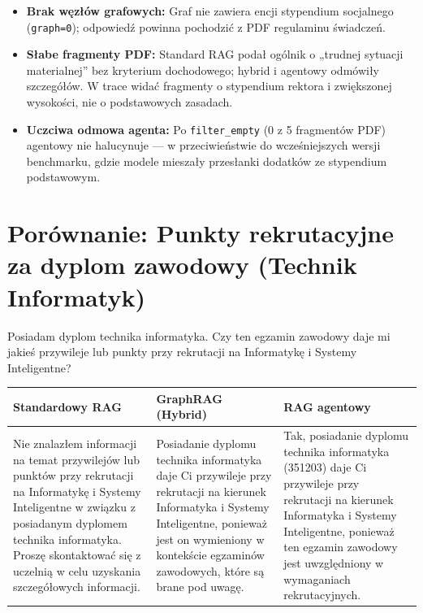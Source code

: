 \begin{tcolorbox}[colback=red!5!white,colframe=red!50!black,title=Wnioski i obserwacje]
    \begin{itemize}
        \item \textbf{Brak węzłów grafowych:} Graf nie zawiera encji stypendium socjalnego (\texttt{graph=0}); odpowiedź powinna pochodzić z PDF regulaminu świadczeń.
        \item \textbf{Słabe fragmenty PDF:} Standard RAG podał ogólnik o „trudnej sytuacji materialnej'' bez kryterium dochodowego; hybrid i agentowy odmówiły szczegółów. W trace widać fragmenty o stypendium rektora i zwiększonej wysokości, nie o podstawowych zasadach.
        \item \textbf{Uczciwa odmowa agenta:} Po \texttt{filter\_empty} (0 z 5 fragmentów PDF) agentowy nie halucynuje --- w przeciwieństwie do wcześniejszych wersji benchmarku, gdzie modele mieszały przesłanki dodatków ze stypendium podstawowym.
    \end{itemize}
\end{tcolorbox}
\vspace{1em}

\newpage
\section*{Porównanie: Punkty rekrutacyjne za dyplom zawodowy (Technik Informatyk)}

\begin{tcolorbox}[colback=blue!5!white,colframe=blue!75!black,title=Pytanie użytkownika]
    Posiadam dyplom technika informatyka. Czy ten egzamin zawodowy daje mi jakieś przywileje lub punkty przy rekrutacji na Informatykę i Systemy Inteligentne?
\end{tcolorbox}

\noindent
\begin{tabularx}{\textwidth}{@{} >{\raggedright\arraybackslash}X >{\raggedright\arraybackslash}X >{\raggedright\arraybackslash}X @{}}
    \toprule
    \textbf{Standardowy RAG} & \textbf{GraphRAG (Hybrid)} & \textbf{RAG agentowy} \\
    \midrule
    \footnotesize Nie znalazłem informacji na temat przywilejów lub punktów przy rekrutacji na Informatykę i Systemy Inteligentne w związku z posiadanym dyplomem technika informatyka. Proszę skontaktować się z uczelnią w celu uzyskania szczegółowych informacji. & \footnotesize Posiadanie dyplomu technika informatyka daje Ci przywileje przy rekrutacji na kierunek Informatyka i Systemy Inteligentne, ponieważ jest on wymieniony w kontekście egzaminów zawodowych, które są brane pod uwagę. & \footnotesize Tak, posiadanie dyplomu technika informatyka (351203) daje Ci przywileje przy rekrutacji na kierunek Informatyka i Systemy Inteligentne, ponieważ ten egzamin zawodowy jest uwzględniony w wymaganiach rekrutacyjnych. \\
    \bottomrule
\end{tabularx}

